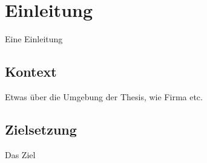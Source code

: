\chapter{Einleitung}

Eine Einleitung


\section{Kontext}

Etwas über die Umgebung der Thesis, wie Firma etc.


\section{Zielsetzung}

Das Ziel


%
